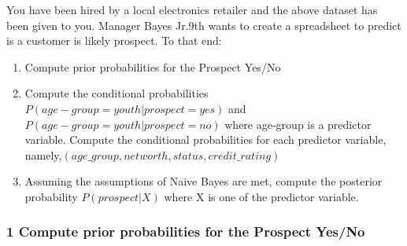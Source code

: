 \documentclass[]{article}
\newenvironment{Shaded}{\begin{snugshade}}{\end{snugshade}}
\newcommand{\KeywordTok}[1]{\textcolor[rgb]{0.13,0.29,0.53}{\textbf{#1}}}
\newcommand{\DecValTok}[1]{\textcolor[rgb]{0.00,0.00,0.81}{#1}}
\newcommand{\StringTok}[1]{\textcolor[rgb]{0.31,0.60,0.02}{#1}}
\newcommand{\CommentTok}[1]{\textcolor[rgb]{0.56,0.35,0.01}{\textit{#1}}}
\newcommand{\OperatorTok}[1]{\textcolor[rgb]{0.81,0.36,0.00}{\textbf{#1}}}
\newcommand{\NormalTok}[1]{#1}
\providecommand{\tightlist}{%
  \setlength{\itemsep}{0pt}\setlength{\parskip}{0pt}}
\begin{document}
You have been hired by a local electronics retailer and the above
dataset has been given to you. Manager Bayes Jr.9th wants to create a
spreadsheet to predict is a customer is likely prospect. To that end:

\begin{enumerate}
\def\labelenumi{\arabic{enumi}.}
\tightlist
\item
  Compute prior probabilities for the Prospect Yes/No
\item
  Compute the conditional probabilities
  \(P(age-group=youth|prospect=yes)\) and
  \(P(age-group=youth|prospect=no)\) where age-group is a predictor
  variable. Compute the conditional probabilities for each predictor
  variable, namely,\((age\_group,networth,status,credit\_rating)\)
\item
  Assuming the assumptions of Naive Bayes are met, compute the posterior
  probability \(P(prospect|X)\) where X is one of the predictor
  variable.
\end{enumerate}

\subsubsection{1 Compute prior probabilities for the Prospect
Yes/No}\label{compute-prior-probabilities-for-the-prospect-yesno}

\begin{Shaded}
\end{Shaded}
\end{document}
